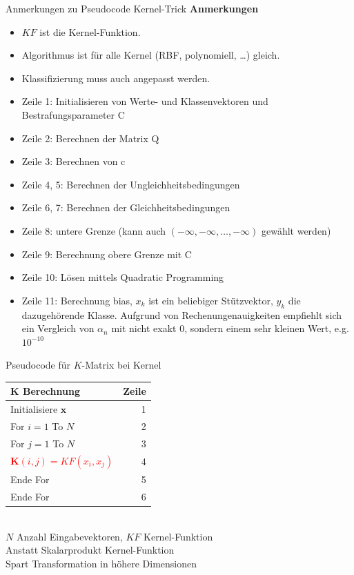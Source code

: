 \documentclass[ngerman]{beamer}
\begin{document}
\begin{frame}{Anmerkungen zu Pseudocode Kernel-Trick}
    \textbf{Anmerkungen} \\
    \begin{itemize}
        \item $KF$ ist die Kernel-Funktion.
        \item Algorithmus ist für alle Kernel (RBF, polynomiell, \ldots) gleich.
        \item Klassifizierung muss auch angepasst werden.
        \item Zeile 1: Initialisieren von Werte- und Klassenvektoren und Bestrafungsparameter C
        \item Zeile 2: Berechnen der Matrix Q
        \item Zeile 3: Berechnen von c
        \item Zeile 4, 5: Berechnen der Ungleichheitsbedingungen
        \item Zeile 6, 7: Berechnen der Gleichheitsbedingungen
        \item Zeile 8: untere Grenze (kann auch $\left( -\infty, -\infty, \ldots, -\infty \right)$ gewählt werden)
        \item Zeile 9: Berechnung obere Grenze mit C
        \item Zeile 10: Lösen mittels Quadratic Programming
        \item Zeile 11: Berechnung bias, $x_{k}$ ist ein beliebiger Stützvektor, $y_{k}$ die dazugehörende Klasse. Aufgrund von Rechenungenauigkeiten empfiehlt sich ein Vergleich von $\alpha_{n}$ mit nicht exakt $0$, sondern einem sehr kleinen Wert, e.g. $10^{-10}$
    \end{itemize}
\end{frame}

\begin{frame}{Pseudocode für $K$-Matrix bei Kernel}
    \centering
    \begin{tabular}{l r}
        $\mathbf{K}$ \textbf{Berechnung} & \textbf{Zeile} \\
        \hline
        Initialisiere $\mathbf{x}$ & 1 \\
        For $i=1$ To $N$ & 2 \\
        \quad For $j=1$ To $N$ & 3 \\ \pause
        \textcolor{red}{\quad\quad $\mathbf{K}\left( i, j \right) = KF\left( x_{i}, x_{j} \right)$} & 4 \\
        \quad Ende For & 5 \\
        Ende For & 6 \\
    \end{tabular} \pause \\
    \vspace{\baselineskip}
    $N$ Anzahl Eingabevektoren, $KF$ Kernel-Funktion \\
    Anstatt Skalarprodukt Kernel-Funktion \\
    Spart Transformation in höhere Dimensionen
\end{frame}
\end{document}
